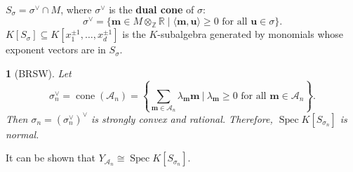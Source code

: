 \documentclass[mathserif,handout]{beamer}
\newcommand{\vect}[1]{\mathbf#1}
\newcommand{\Z}{\mathbb Z}
\newcommand{\R}{\mathbb R}
\DeclareMathOperator{\Spec}{Spec}
\DeclareMathOperator{\cone}{cone}
\theoremstyle{plain}
\newtheorem{thm}{\color{white}{Theorem}}[subsection]
\theoremstyle{definition}
\theoremstyle{remark}
\begin{document}
\begin{frame}
$S_{\sigma}=\sigma^{\vee}\cap M$, where $\sigma^{\vee}$ is the \textbf{dual cone} of $\sigma$:
\[
\sigma^{\vee} = \{\vect m\in M\otimes_{\Z}\R\mid \langle \vect m,\vect u\rangle\geq 0 \text{ for all $\vect u\in\sigma$}\}.
\]
\pause
$K[S_{\sigma}]\subseteq K[x_1^{\pm 1},\dots,x_d^{\pm 1}]$ is the $K$-subalgebra generated by monomials whose exponent vectors are in $S_{\sigma}$.
\end{frame}

\begin{frame}
\begin{thm}[BRSW]
Let 
\[
\sigma_n^{\vee} = \cone(\mathscr A_n) = \left\{\sum_{\vect m\in\mathscr A_n}\lambda_{\vect m}\vect m\ \bigg|\  \lambda_{\vect m}\geq 0\text{ for all $\vect m\in\mathscr A_n$}\right\}.
\]
Then $\sigma_n=(\sigma_n^{\vee})^{\vee}$ is strongly convex and rational.  Therefore, $\Spec K[S_{\sigma_n}]$ is normal. 
\end{thm}

\pause
It can be shown that $Y_{\mathscr A_n}\cong\Spec K[S_{\sigma_n}]$.
\end{frame}
\end{document}
